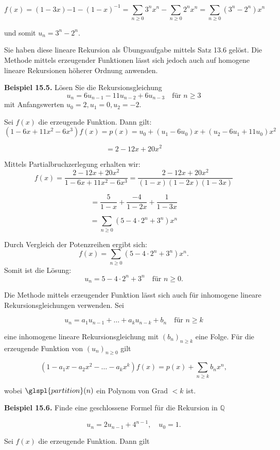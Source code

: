 \documentclass[9pt]{article}
\begin{document}
\[
f(x) = (1 - 3x){-1}  - (1 - x)^{-1} = \sum\limits_{n \geq 0} 3^n x^n - \sum\limits_{n \geq 0} 2^n x^n = \sum\limits_{n \geq 0} (3^n - 2^n)x^n
\]

und somit \( u_n = 3^n - 2^n \).  

Sie haben diese lineare Rekursion als Übungsaufgabe mittels Satz 13.6  
gelöst. Die Methode mittels erzeugender Funktionen lässt sich jedoch auch  
auf homogene lineare Rekursionen höherer Ordnung anwenden.

\textbf{Beispiel 15.5.} Lösen Sie die Rekursionsgleichung
\[
u_n = 6u_{n-1} - 11u_{n-2} + 6u_{n-3} \quad \text{für } n \geq 3
\]
mit Anfangswerten \( u_0 = 2, u_1 = 0, u_2 = -2 \).  

Sei \( f(x) \) die erzeugende Funktion. Dann gilt:
\[
(1 - 6x + 11x^2 - 6x^3) f(x) = p(x) = u_0 + (u_1 - 6u_0)x + (u_2 - 6u_1 + 11u_0)x^2
\]

\[
= 2 - 12x + 20x^2
\]

Mittels Partialbruchzerlegung erhalten wir:
\[
f(x) = \frac{2 - 12x + 20x^2}{1 - 6x + 11x^2 - 6x^3} = \frac{2 - 12x + 20x^2}{(1 - x)(1 - 2x)(1 - 3x)}
\]

\[
= \frac{5}{1 - x} + \frac{-4}{1 - 2x} + \frac{1}{1 - 3x}
\]

\[
= \sum_{n \geq 0} (5 - 4 \cdot 2^n + 3^n)x^n
\]

Durch Vergleich der Potenzreihen ergibt sich:
\[
f(x) = \sum_{n \geq 0} (5 - 4 \cdot 2^n + 3^n)x^n.
\]
Somit ist die Lösung:
\[
u_n = 5 - 4 \cdot 2^n + 3^n \quad \text{für } n \geq 0.
\]

Die Methode mittels erzeugender Funktion lässt sich auch für inhomogene
lineare Rekursionsgleichungen verwenden. Sei

\[
u_n = a_1 u_{n-1} + \dots + a_k u_{n-k} + b_n \quad \text{für } n \geq k
\]

eine inhomogene lineare Rekursionsgleichung mit \((b_n)_{n \geq k}\) eine Folge. 
Für die erzeugende Funktion von \((u_n)_{n \geq 0}\) gilt

\[
(1 - a_1x - a_2x^2 - \dots - a_kx^k) f(x) = p(x) + \sum_{n \geq k} b_n x^n,
\]

wobei \(\glspl{partition}(n) \) ein Polynom von Grad \( < k \) ist.

\textbf{Beispiel 15.6.} Finde eine geschlossene Formel für die Rekursion in $\mathbb{Q}$

\[
u_n = 2u_{n-1} + 4^{n-1}, \quad u_0 = 1.
\]

Sei \( f(x) \) die erzeugende Funktion. Dann gilt
\end{document}
